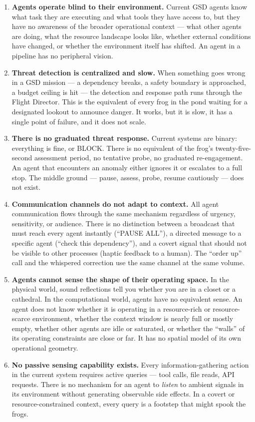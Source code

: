 \documentclass[11pt,letterpaper]{article}
\begin{document}
\begin{enumerate}[leftmargin=2em]
\item \textbf{Agents operate blind to their environment.} Current GSD agents know what task they are executing and what tools they have access to, but they have no awareness of the broader operational context --- what other agents are doing, what the resource landscape looks like, whether external conditions have changed, or whether the environment itself has shifted. An agent in a pipeline has no peripheral vision.

\item \textbf{Threat detection is centralized and slow.} When something goes wrong in a GSD mission --- a dependency breaks, a safety boundary is approached, a budget ceiling is hit --- the detection and response path runs through the Flight Director. This is the equivalent of every frog in the pond waiting for a designated lookout to announce danger. It works, but it is slow, it has a single point of failure, and it does not scale.

\item \textbf{There is no graduated threat response.} Current systems are binary: everything is fine, or BLOCK. There is no equivalent of the frog's twenty-five-second assessment period, no tentative probe, no graduated re-engagement. An agent that encounters an anomaly either ignores it or escalates to a full stop. The middle ground --- pause, assess, probe, resume cautiously --- does not exist.

\item \textbf{Communication channels do not adapt to context.} All agent communication flows through the same mechanism regardless of urgency, sensitivity, or audience. There is no distinction between a broadcast that must reach every agent instantly (``PAUSE ALL''), a directed message to a specific agent (``check this dependency''), and a covert signal that should not be visible to other processes (haptic feedback to a human). The ``order up'' call and the whispered correction use the same channel at the same volume.

\item \textbf{Agents cannot sense the shape of their operating space.} In the physical world, sound reflections tell you whether you are in a closet or a cathedral. In the computational world, agents have no equivalent sense. An agent does not know whether it is operating in a resource-rich or resource-scarce environment, whether the context window is nearly full or mostly empty, whether other agents are idle or saturated, or whether the ``walls'' of its operating constraints are close or far. It has no spatial model of its own operational geometry.

\item \textbf{No passive sensing capability exists.} Every information-gathering action in the current system requires active queries --- tool calls, file reads, API requests. There is no mechanism for an agent to \textit{listen} to ambient signals in its environment without generating observable side effects. In a covert or resource-constrained context, every query is a footstep that might spook the frogs.
\end{enumerate}
\end{document}

